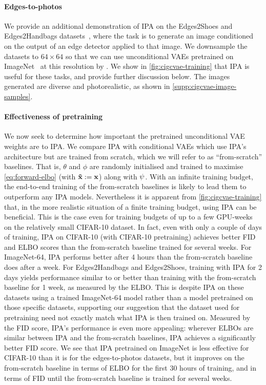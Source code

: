 \paragraph{Edges-to-photos}
We provide an additional demonstration of IPA on the Edges2Shoes and
Edges2Handbags datasets~\citep{isola2016image}, where the task is to generate an
image conditioned on the output of an edge detector applied to that image. We
downsample the datasets to $64\times64$ so that we can use unconditional VAEs
pretrained on ImageNet~\citep{deng2009imagenet} at this resolution by
\citet{child2020very}. We show in \cref{fig:cigcvae-training} that IPA is useful for
these tasks, and provide further discussion below. The images generated are
diverse and photorealistic, as shown in \cref{supp:cigcvae-image-samples}.

\paragraph{Effectiveness of pretraining}
We now seek to determine how important the pretrained unconditional VAE weights
are to IPA. We compare IPA with conditional VAEs which use IPA's architecture
but are trained from scratch, which we will refer to as ``from-scratch''
baselines. That is, $\theta$ and $\phi$ are randomly initialised and trained to
maximise \cref{eq:forward-elbo} (with $\mathbf{\tilde{x}}{} := \mathbf{x}{}$) along with
$\psi$.
%
With an infinite training budget, the end-to-end training of the from-scratch
baselines is likely to lead them to outperform any IPA models. Nevertheless it
is apparent from \cref{fig:cigcvae-training} that, in the more realistic situation of a
finite training budget, using IPA can be beneficial. This is the case even for
training budgets of up to a few GPU-weeks on the relatively small CIFAR-10
dataset. In fact, even with only a couple of days of training, IPA on CIFAR-10
(with CIFAR-10 pretraining) achieves better FID and ELBO scores than the
from-scratch baseline trained for several weeks. For ImageNet-64, IPA performs
better after 4 hours than the from-scratch baseline does after a week.
%
For Edges2Handbags and Edges2Shoes, training with IPA for 2 days yields
performance similar to or better than training with the from-scratch baseline
for 1 week, as measured by the ELBO. This is despite IPA on these datasets using
a trained ImageNet-64 model rather than a model pretrained on those specific
datasets, supporting our suggestion that the dataset used for pretraining need
not exactly match what IPA is then trained on.
%
Measured by the FID score, IPA's performance is even more appealing: wherever
ELBOs are similar between IPA and the from-scratch baselines, IPA achieves a
significantly better FID score.
%
We see that IPA pretrained on ImageNet is less effective for CIFAR-10
than it is for the edges-to-photos datasets, but it improves on the from-scratch
baseline in terms of ELBO for the first 30 hours of training, and in terms of
FID until the from-scratch baseline is trained for several weeks.

